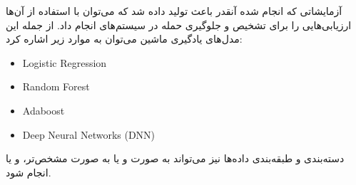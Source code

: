 آزمایشاتی که انجام شده آنقدر باعث تولید داده شد که می‌توان با استفاده از آن‌ها
ارزیابی‌هایی را برای تشخیص و جلوگیری حمله در سیستم‌های  انجام داد. از
جمله این مدل‌های یادگیری ماشین می‌توان به موارد زیر اشاره کرد:

\begin{LTR}
    \begin{itemize}
        \item Logistic Regression
        \item Random Forest
        \item Adaboost
        \item Deep Neural Networks (DNN)
    \end{itemize}
\end{LTR}

دسته‌بندی و طبقه‌بندی داده‌ها نیز می‌تواند به صورت  و  یا
به صورت مشخص‌تر،  و یا  انجام شود.